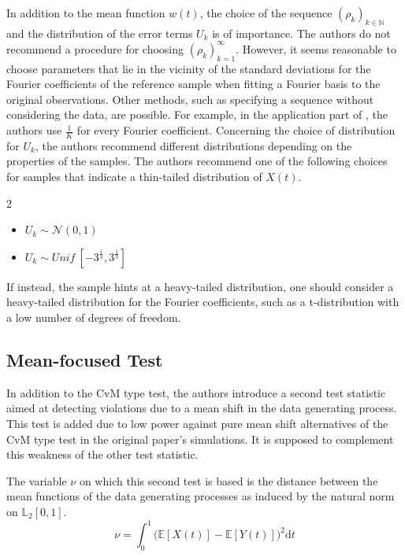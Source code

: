 \documentclass[12pt, a4paper]{article}
\theoremstyle{MAstyle} \newtheorem{assumption}{Assumption}[section]
\theoremstyle{MAstyle} \newtheorem{definition}{Definition}[section]
\theoremstyle{MAstyle} \newtheorem{theorem}{Theorem}[section]
\begin{document}
			In addition to the mean function $w(t)$, the choice of the sequence $(\rho_k)_{k \in \mathbb{N}}$ and the distribution of the error terms $U_k$ is of importance.			
			The authors do not recommend a procedure for choosing $(\rho_k)_{k = 1}^{\infty}$. However, it seems reasonable to choose parameters that lie in the vicinity of the standard deviations for the Fourier coefficients of the reference sample when fitting a Fourier basis to the original observations. Other methods, such as specifying a sequence without considering the data, are possible. For example, in the application part of \cite{bugni_permutation_2021}, the authors use $\frac{1}{K}$ for every Fourier coefficient. 
			Concerning the choice of distribution for $U_k$, the authors recommend different distributions depending on the properties of the samples. The authors recommend one of the following choices for samples that indicate a thin-tailed distribution of $X(t)$.
			\begin{multicols}{2}
				\begin{itemize}
					\item $U_k \sim \mathcal{N}(0,1)$
					\item $U_k \sim \textit{Unif}\ [-3^{\frac{1}{3}}, 3^{\frac{1}{3}}]$
				\end{itemize}
			\end{multicols}
			If instead, the sample hints at a heavy-tailed distribution, one should consider a heavy-tailed distribution for the Fourier coefficients, such as a t-distribution with a low number of degrees of freedom.
			
		\subsection{Mean-focused Test}\label{mean_based_test}
			In addition to the CvM type test, the authors introduce a second test statistic aimed at detecting violations due to a mean shift in the data generating process. This test is added due to low power against pure mean shift alternatives of the CvM type test in the original paper's simulations. It is supposed to complement this weakness of the other test statistic.
			
			The variable $\nu$ on which this second test is based is the distance between the mean functions of the data generating processes as induced by the natural norm on $\mathbb{L}_2[0,1]$.
			\begin{equation}
				\nu = \int_{0}^{1} \big(\mathbb{E}\left[X(t)\right] - \mathbb{E}\left[Y(t)\right]\big)^2 \mathrm{d}t
			\end{equation}
		
\end{document}
